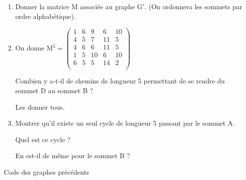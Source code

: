 \begin{enumerate}
\medskip
\begin{center}
\end{center}

\begin{enumerate}
\item Donner la matrice M associée au graphe G$'$. (On ordonnera les sommets
par ordre alphabétique).
\item On donne M$^5
= \begin{pmatrix}
1& 6& 9& 6& 10\\
4& 5& 7& 11& 5\\
4& 6& 6& 11& 5\\
1& 5& 10& 6& 10\\
6& 5& 5& 14& 2\\
\end{pmatrix}$

Combien y a-t-il de chemins de longueur 5 permettant de se rendre du
sommet D au sommet B ?

Les donner tous.
\item Montrer qu'il existe un seul cycle de longueur 5 passant par le sommet A.

Quel est ce cycle ?

En est-il de même pour le sommet B ?
 \end{enumerate}
\end{enumerate}

\vfill\newpage\null
Code des graphes précédents

